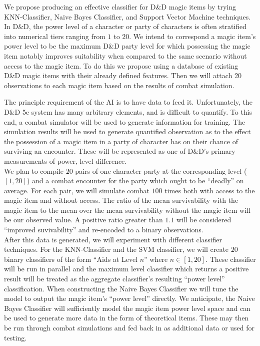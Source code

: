 \documentclass[12pt]{diazessay}
\begin{document}
We propose producing an effective classifier for D\&D magic items by trying KNN-Classifier, Naive Bayes Classifier, and Support Vector Machine techniques.
In D\&D, the power level of a character or party of characters is often stratified into numerical tiers ranging from $1$ to $20$.
We intend to correspond a magic item's power level to be the maximum D\&D party level for which possessing the magic item notably improves suitability when compared to the same scenario without access to the magic item.
To do this we propose using a database of existing D\&D magic items with their already defined features.
Then we will attach 20 observations to each magic item based on the results of combat simulation.

The principle requirement of the AI is to have data to feed it.
Unfortunately, the D\&D 5e system has many arbitrary elements, and is difficult to quantify.
To this end, a combat simulator will be used to generate information for training.
The simulation results will be used to generate quantified observation as to the effect the possession of a magic item in a party of character has on their chance of surviving an encounter.
These will be represented as one of D\&D's primary measurements of power, level difference.\\

We plan to compile $20$ pairs of one character party at the corresponding level ($[1,20]$) and a combat encounter for the party which ought to be ``deadly'' on average.
For each pair, we will simulate combat $100$ times both with access to the magic item and without access.
The ratio of the mean survivability with the magic item to the mean over the mean survivability without the magic item will be our observed value.
A positive ratio greater than $1.1$ will be considered ``improved suvivability'' and re-encoded to a binary observations.\\

After this data is generated, we will experiment with different classifier techniques.
For the KNN-Classifier and the SVM classifier, we will create $20$ binary classifiers of the form ``Aids at Level $n$'' where $n \in [1,20]$.
These classifier will be run in parallel and the maximum level classifier which returns a positive result will be treated as the aggregate classifier's resulting ``power level'' classification.
When constructing the Naive Bayes Classifier we will tune the model to output the magic item's ``power level'' directly.
We anticipate, the Naive Bayes Classifier will sufficiently model the magic item power level space and can be used to generate more data in the form of theoretical items.
These may then be run through combat simulations and fed back in as additional data or used for testing.\\
\end{document}
